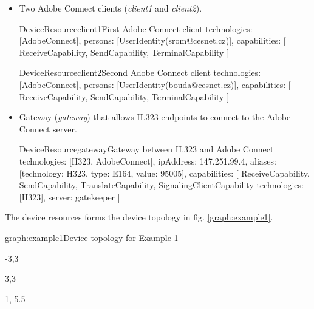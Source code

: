 \begin{itemize}
\item Two Adobe Connect clients (\emph{client1} and \emph{client2}).

\begin{EntityExample}{DeviceResource}{client1}{First Adobe Connect client}
technologies: [AdobeConnect], 
persons: [UserIdentity(srom@cesnet.cz)],
capabilities: [
  ReceiveCapability, SendCapability, TerminalCapability
]
\end{EntityExample}

\begin{EntityExample}{DeviceResource}{client2}{Second Adobe Connect client}
technologies: [AdobeConnect], 
persons: [UserIdentity(bouda@cesnet.cz)],
capabilities: [
  ReceiveCapability, SendCapability, TerminalCapability
]
\end{EntityExample}

\item Gateway (\emph{gateway}) that allows H.323 endpoints to connect to
  the Adobe Connect server.
    
\begin{EntityExample}{DeviceResource}{gateway}{Gateway between H.323 and Adobe Connect}
technologies: [H323, AdobeConnect], 
ipAddress: 147.251.99.4,
aliases: [{technology: H323, type: E164, value: 95005}],
capabilities: [
  ReceiveCapability, SendCapability,
  TranslateCapability,
  SignalingClientCapability {technologies: [H323], server: gatekeeper}
]
\end{EntityExample}

\end{itemize}

The device resources forms the device topology in fig. \ref{graph:example1}. 

\begin{Graph}{graph:example1}{Device topology for Example 1}  
  \begin{SubGraph}{-3,3}{}
  \end{SubGraph}
  
  \begin{SubGraph}{3,3}{}
  \end{SubGraph}
  
  
  \begin{GraphLegend}{1, 5.5}
  \end{GraphLegend}
\end{Graph}

